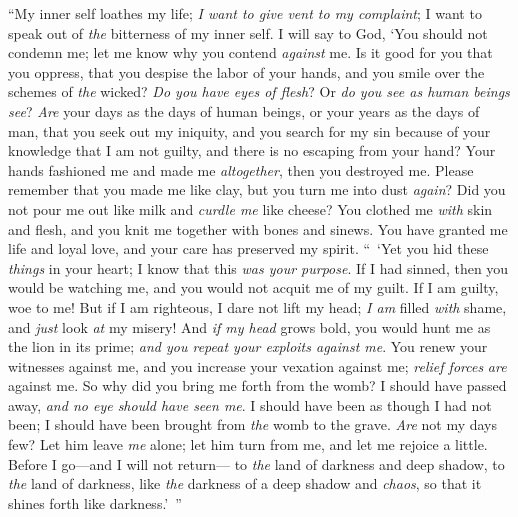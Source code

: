 \begin{biblechapter} %
 “My inner self loathes my life; 
\textit{I want to give vent to my complaint}; 
I want to speak out of \textit{the} bitterness of my inner self.
\verse I will say to God, ‘You should not condemn me; 
let me know why you contend \textit{against} me.
\verse Is it good for you that you oppress, 
that you despise the labor of your hands, 
and you smile over the schemes of \textit{the} wicked?
\verse \textit{Do you have eyes of flesh}? 
Or \textit{do you see as human beings see}?
\verse \textit{Are} your days as the days of human beings, 
or your years as the days of man,
\verse that you seek out my iniquity, 
and you search for my sin
\verse because of your knowledge that I am not guilty, 
and there is no escaping from your hand?
\verse Your hands fashioned me and made me \textit{altogether}, 
then you destroyed me.
\verse Please remember that you made me like clay, 
but you turn me into dust \textit{again}?
\verse Did you not pour me out like milk 
and \textit{curdle me} like cheese?
\verse You clothed me \textit{with} skin and flesh, 
and you knit me together with bones and sinews.
\verse You have granted me life and loyal love, 
and your care has preserved my spirit.
\verse “ ‘Yet you hid these \textit{things} in your heart; 
I know that this \textit{was your purpose}.
\verse If I had sinned, then you would be watching me, 
and you would not acquit me of my guilt.
\verse If I am guilty, woe to me! 
But if I am righteous, I dare not lift my head; 
\textit{I am} filled \textit{with} shame, and \textit{just} look \textit{at} my misery!
\verse And \textit{if my head} grows bold, you would hunt me as the lion in its prime; 
\textit{and you repeat your exploits against me}.
\verse You renew your witnesses against me, 
and you increase your vexation against me; 
\textit{relief forces} \textit{are} against me.
\verse So why did you bring me forth from the womb? 
I should have passed away, \textit{and no eye should have seen me}.
\verse I should have been as though I had not been; 
I should have been brought from \textit{the} womb to the grave.
\verse \textit{Are} not my days few? Let him leave \textit{me} alone; 
let him turn from me, and let me rejoice a little.
\verse Before I go—and I will not return— 
to \textit{the} land of darkness and deep shadow,
\verse to \textit{the} land of darkness, 
like \textit{the} darkness of a deep shadow and \textit{chaos}, 
so that it shines forth like darkness.’ ”
\end{biblechapter}

